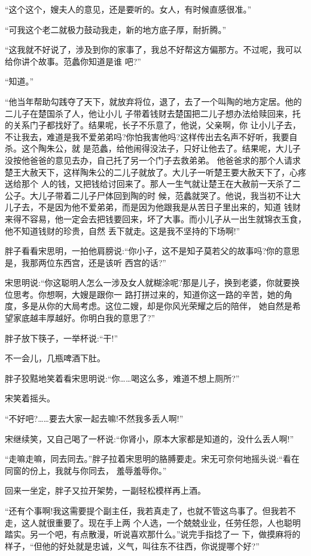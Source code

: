 \documentclass[11pt,a4paper,onecolumn]{article}
\begin{document}
``这个这个，嫂夫人的意见，还是要听的。女人，有时候直感很准。''

``可我这个老二就极力鼓动我走，新的地方底子厚，耐折腾。''

``这我就不好说了，涉及到你的家事了，我总不好帮这方偏那方。不过呢，我可以给你讲个故事。范蠡你知道是谁
吧?''

``知道。''

``他当年帮助勾践夺了天下，就放弃将位，退了，去了一个叫陶的地方定居。他的二儿子在楚国杀了人，他让小儿
子带着钱财去楚国把二儿子想办法给赎回来，托的关系门子都找好了。结果呢，长子不乐意了，他说，父亲啊，你
让小儿子去，不让我去，难道是我不爱弟弟吗?你怕我害他吗?这样传出去名声不好听，我要自杀。这个陶朱公，就
是范蠡，给他闹得没法子，只好让他去了。结果呢，大儿子没按他爸爸的意见去办，自己托了另一个门子去救弟弟。
他爸爸求的那个人请求楚王大赦天下，这样陶朱公的二儿子就放了。大儿子一听楚王要大赦天下了，心疼送给那个
人的钱，又把钱给讨回来了。那人一生气就让楚王在大赦前一天杀了二公子。大儿子带着二儿子尸体回到陶的时
候，范蠡就哭了。他说，我当初不让大儿子去，不是因为他不爱弟弟，而是因为他跟我是从苦日子里出来的，知道
钱财来得不容易，他一定会去把钱要回来，坏了大事。而小儿子从一出生就锦衣玉食，他不知道钱财的珍贵，自然
丢下就走。这是我不坚持的下场啊!''

胖子看看宋思明，一拍他肩膀说:``你小子，这不是知子莫若父的故事吗?你的意思是，我那两位东西宫，还是该听
西宫的话?''

宋思明说:``你这聪明人怎么一涉及女人就糊涂呢?那是儿子，换到老婆，你就要换位思考。你想啊，大嫂是跟你一
路打拼过来的，知道你这一路的辛苦，她的角度，多是从你的大局考虑。这位二嫂，却是你风光荣耀之后的陪伴，
她自然是希望家底越丰厚越好。你明白我的意思了?''

胖子放下筷子，一举杯说:``干!''

不一会儿，几瓶啤酒下肚。

胖子狡黠地笑着看宋思明说:``你……喝这么多，难道不想上厕所?''

宋笑着摇头。

``不好吧?……要去大家一起去嘛!不然我多丢人啊!''

宋继续笑，又自己喝了一杯说:``你肾小，原本大家都是知道的，没什么丢人啊!''

``走嘛走嘛，同去同去。''胖子拉着宋思明的胳膊要走。宋无可奈何地摇头说:``看在同窗的份上，我就与你同去，
羞辱羞辱你。''

回来一坐定，胖子又拉开架势，一副轻松模样再上酒。

``还有个事啊!我这需要提个副主任，我若真走了，也就不管这鸟事了。但我若不走，这人就很重要了。现在手上两
个人选，一个兢兢业业，任劳任怨，人也聪明踏实。另一个吧，有点散漫，听说喜欢那什么。''说完手指捻了一
下，做摸麻将的样子，``但他的好处就是忠诚，义气，叫往东不往西，你说提哪个好?''
\end{document}
